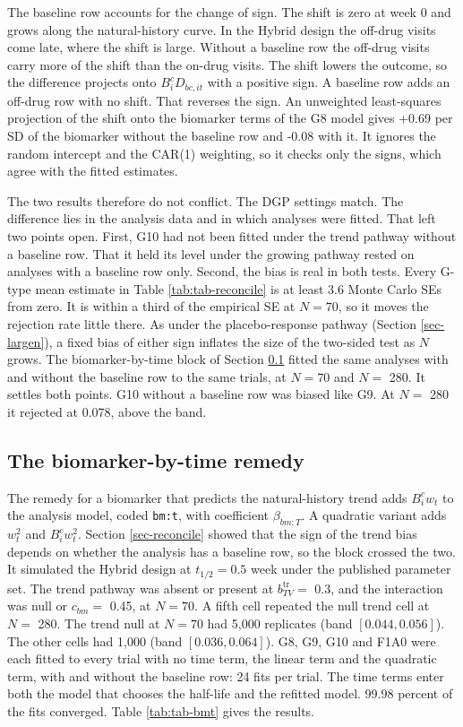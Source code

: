 \documentclass[
  11pt,
]{article}
\begin{document}
The baseline row accounts for the change of sign. The shift is zero
at week 0 and grows along the natural-history curve. In the Hybrid
design the off-drug visits come late, where the shift is large.
Without a baseline row the off-drug visits carry more of the shift
than the on-drug visits. The shift lowers the outcome, so the
difference projects onto \(B^c_i D_{bc,it}\) with a positive sign. A
baseline row adds an off-drug row with no shift. That reverses the
sign. An unweighted least-squares projection of the shift onto the
biomarker terms of the G8 model gives +0.69 per SD of the
biomarker without the baseline row and -0.08 with it. It
ignores the random intercept and the CAR(1) weighting, so it checks
only the signs, which agree with the fitted estimates.

The two results therefore do not conflict. The DGP settings match.
The difference lies in the analysis data and in which analyses were
fitted. That left two points open. First, G10 had not been fitted
under the trend pathway without a baseline row. That it held its level
under the growing pathway rested on analyses with a baseline row only.
Second, the bias is real in both tests. Every G-type mean estimate in
Table \ref{tab:tab-reconcile} is at least 3.6 Monte
Carlo SEs from zero. It is within a third of the empirical SE at
\(N = 70\), so it moves the rejection rate little there. As under the
placebo-response pathway (Section \ref{sec-largen}), a fixed bias of
either sign inflates the size of the two-sided test as \(N\) grows. The
biomarker-by-time block of Section \ref{sec-bmt} fitted the same
analyses with and without the baseline row to the same trials, at
\(N = 70\) and \(N =\) 280. It settles both points. G10
without a baseline row was biased like G9. At \(N =\) 280
it rejected at 0.078, above the band.

\subsection{The biomarker-by-time remedy}\label{sec-bmt}

The remedy for a biomarker that predicts the natural-history trend
adds \(B^c_i w_t\) to the analysis model, coded \texttt{bm:t}, with coefficient
\(\beta_{bm:T}\). A quadratic variant adds \(w_t^2\) and \(B^c_i w_t^2\).
Section \ref{sec-reconcile} showed that the sign of the trend bias
depends on whether the analysis has a baseline row, so the block
crossed the two. It simulated the Hybrid design at \(t_{1/2} = 0.5\)
week under the published parameter set. The trend pathway was absent
or present at \(b_{TV}^{\mathrm{tr}} =\) 0.3, and the
interaction was null or \(c_{bm} =\) 0.45, at \(N = 70\). A
fifth cell repeated the null trend cell at \(N =\) 280.
The trend null at \(N = 70\) had 5,000 replicates (band
\([0.044, 0.056]\)). The other cells had 1,000 (band
\([0.036, 0.064]\)). G8, G9, G10 and F1A0 were each fitted to every
trial with no time term, the linear term and the quadratic term, with
and without the baseline row: 24 fits per trial. The time terms enter
both the model that chooses the half-life and the refitted model.
99.98 percent of the fits converged. Table
\ref{tab:tab-bmt} gives the results.
\end{document}
